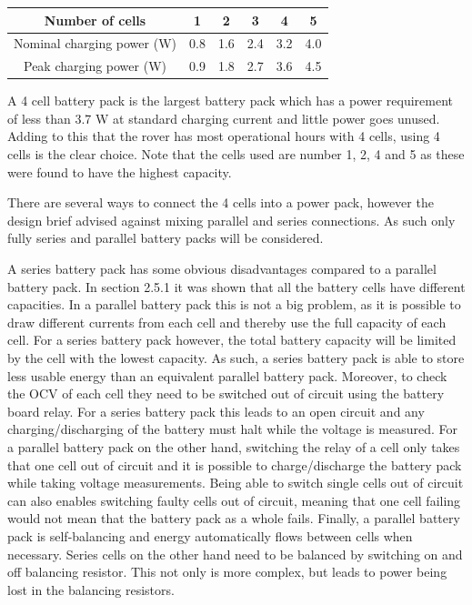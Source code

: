 \documentclass[a4paper]{article}
\begin{document}
\begin{center}
    \begin{tabular}{||c| c c c c c||} 
    \hline
    Number of cells& 1 & 2 & 3 & 4 & 5 \\ [0.5ex] 
    \hline
    Nominal charging power (W) & 0.8 & 1.6 & 2.4 & 3.2 & 4.0\\ [1ex] 
    \hline
    Peak charging power (W) & 0.9 & 1.8 & 2.7 & 3.6 & 4.5 \\ [1ex] 
    \hline
   \end{tabular}
   \end{center}


A 4 cell battery pack is the largest battery pack which has a power 
requirement of less than 3.7 W at standard charging current and little 
power goes unused. Adding to this that the rover has most operational 
hours with 4 cells, using 4 cells is the clear choice. Note that the 
cells used are number 1, 2, 4 and 5 as these were found to have the 
highest capacity.

There are several ways to connect the 4 cells into a power pack, 
however the design brief advised against mixing parallel and series 
connections\cite{energyBrief}. As such only fully series and parallel 
battery packs will be considered. 

A series battery pack has some obvious disadvantages compared to 
a parallel battery pack. In section 2.5.1 it was shown that all the 
battery cells have different capacities. In a parallel battery pack 
this is not a big problem, as it is possible to draw different currents 
from each cell and thereby use the full capacity of each cell. For a 
series battery pack however, the total battery capacity will be limited 
by the cell with the lowest capacity. As such, a series battery pack 
is able to store less usable energy than an equivalent parallel battery 
pack. Moreover, to check the OCV of each cell they need to be switched 
out of circuit using the battery board relay. For a series battery pack 
this leads to an open circuit and any charging/discharging of the battery 
must halt while the voltage is measured. For a parallel battery pack on the 
other hand, switching the relay of a cell only takes that one cell out of 
circuit and it is possible to charge/discharge the battery pack while 
taking voltage measurements. Being able to switch single cells out of 
circuit can also enables switching faulty cells out of circuit, meaning 
that one cell failing would not mean that the battery pack as a whole fails. 
Finally, a parallel battery pack is self-balancing and energy automatically
flows between cells when necessary\cite{batteryBalancing}. Series cells on the 
other hand need to be balanced by switching on and off balancing resistor. 
This not only is more complex, but leads to power being lost in the balancing
resistors.
\end{document}

